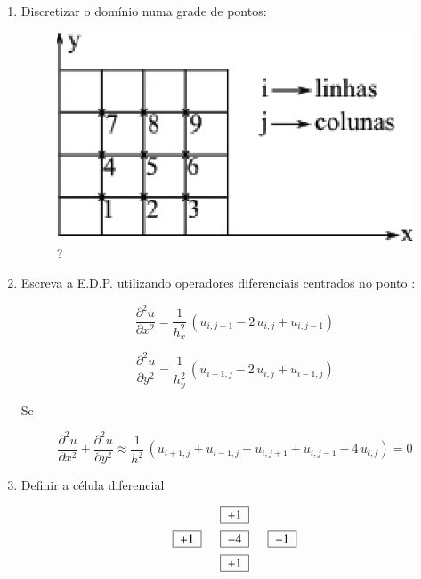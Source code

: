 \begin{enumerate}
 \item Discretizar o domínio numa grade de pontos:

\begin{figure}[htb]
 \centering
 \includegraphics[scale=1.0]{capitulos/capitulo3/figuras/aprox_der_par_dif_fin2.eps}
 \caption{?}
 \label{fig:aprox_der_par_dif_fin2}
\end{figure}

\item Escreva a E.D.P. utilizando operadores diferenciais centrados no ponto :

\begin{equation}
 \label{cap3:sec4:eq1}
 \frac{\partial^2 u}{\partial x^2} = \frac{1}{h_x^2} \, (u_{i,j+1} - 2\,u_{i,j} + u_{i,j-1})
\end{equation}

\begin{equation}
 \label{cap3:sec4:eq2}
 \frac{\partial^2 u}{\partial y^2} = \frac{1}{h_y^2} \, (u_{i+1,j} - 2\,u_{i,j} + u_{i-1,j})
\end{equation}

Se 

\begin{equation}
 \label{cap3:sec4:eq3}
 \frac{\partial^2 u}{\partial x^2} + \frac{\partial^2 u}{\partial y^2} \approx \frac{1}{h^2} \, (u_{i+1,j} + u_{i-1,j} + u_{i,j+1} + u_{i,j-1} - 4\,u_{i,j}) = 0
\end{equation}

\item Definir a célula diferencial

\[
 \begin{array}{lll}
                   & \quadricular{+1} & \vspace*{0.2cm} \\
  \quadricular{+1} & \quadricular{-4} & \quadricular{+1} \vspace*{0.2cm} \\
                   & \quadricular{+1} &
 \end{array}
\]


\end{enumerate}
